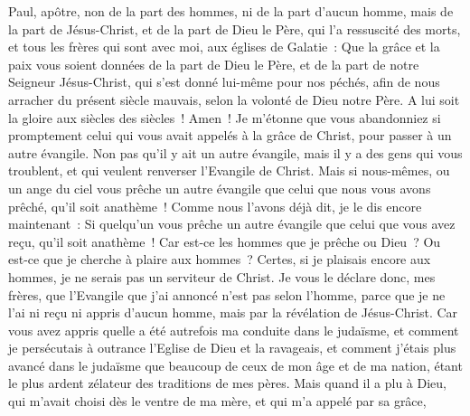 \begin{multicols}{2}
\VerseOne{}Paul, apôtre, non de la part des hommes, ni de la part d'aucun homme, mais de la part de Jésus-Christ, et de la part de Dieu le Père, qui l'a ressuscité des morts,
et tous les frères qui sont avec moi, aux églises de Galatie~:
Que la grâce et la paix vous soient données de la part de Dieu le Père, et de la part de notre Seigneur Jésus-Christ,
qui s'est donné lui-même pour nos péchés, afin de nous arracher du présent siècle mauvais, selon la volonté de Dieu notre Père.
A lui soit la gloire aux siècles des siècles~! Amen~!
Je m'étonne que vous abandonniez si promptement celui qui vous avait appelés à la grâce de Christ, pour passer à un autre évangile.
Non pas qu'il y ait un autre évangile, mais il y a des gens qui vous troublent, et qui veulent renverser l'Evangile de Christ.
Mais si nous-mêmes, ou un ange du ciel vous prêche un autre évangile que celui que nous vous avons prêché, qu'il soit anathème~!
Comme nous l'avons déjà dit, je le dis encore maintenant~: Si quelqu'un vous prêche un autre évangile que celui que vous avez reçu, qu'il soit anathème~!
Car est-ce les hommes que je prêche ou Dieu~? Ou est-ce que je cherche à plaire aux hommes~? Certes, si je plaisais encore aux hommes, je ne serais pas un serviteur de Christ.
Je vous le déclare donc, mes frères, que l'Evangile que j'ai annoncé n'est pas selon l'homme,
parce que je ne l'ai ni reçu ni appris d'aucun homme, mais par la révélation de Jésus-Christ.
Car vous avez appris quelle a été autrefois ma conduite dans le judaïsme, et comment je persécutais à outrance l'Eglise de Dieu et la ravageais,
et comment j'étais plus avancé dans le judaïsme que beaucoup de ceux de mon âge et de ma nation, étant le plus ardent zélateur des traditions de mes pères.
Mais quand il a plu à Dieu, qui m'avait choisi dès le ventre de ma mère, et qui m'a appelé par sa grâce,

\end{multicols}
